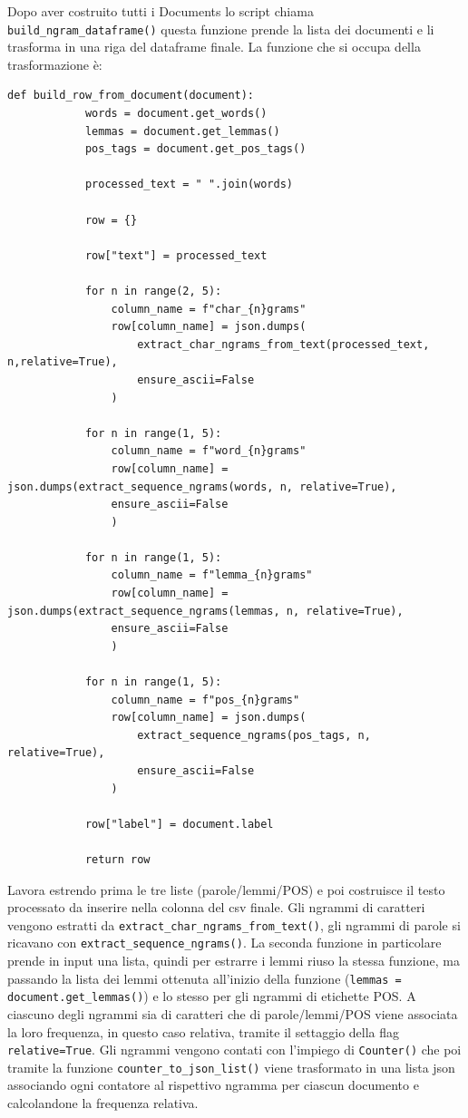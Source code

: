 \documentclass[a4paper,12pt]{report}
\begin{document}
    Dopo aver costruito tutti i Documents lo script chiama \texttt{build\_ngram\_dataframe()} questa funzione prende la lista dei documenti e li trasforma in una riga del dataframe finale. La funzione che si occupa della trasformazione è:
    \begin{lstlisting}[style=rulednumbered, language=python*, gobble=4]
        def build_row_from_document(document):
            words = document.get_words()
            lemmas = document.get_lemmas()
            pos_tags = document.get_pos_tags()

            processed_text = " ".join(words)

            row = {}

            row["text"] = processed_text

            for n in range(2, 5):
                column_name = f"char_{n}grams"
                row[column_name] = json.dumps(
                    extract_char_ngrams_from_text(processed_text, n,relative=True),
                    ensure_ascii=False
                )

            for n in range(1, 5):
                column_name = f"word_{n}grams"
                row[column_name] = json.dumps(extract_sequence_ngrams(words, n, relative=True),
                ensure_ascii=False
                )

            for n in range(1, 5):
                column_name = f"lemma_{n}grams"
                row[column_name] = json.dumps(extract_sequence_ngrams(lemmas, n, relative=True),
                ensure_ascii=False
                )

            for n in range(1, 5):
                column_name = f"pos_{n}grams"
                row[column_name] = json.dumps(
                    extract_sequence_ngrams(pos_tags, n, relative=True),
                    ensure_ascii=False
                )

            row["label"] = document.label

            return row
    \end{lstlisting}
    Lavora estrendo prima le tre liste (parole/lemmi/POS) e poi costruisce il testo processato da inserire nella colonna del csv finale. Gli ngrammi di caratteri vengono estratti da \texttt{extract\_char\_ngrams\_from\_text()}, gli ngrammi di parole si ricavano con \texttt{extract\_sequence\_ngrams()}. La seconda funzione in particolare prende in input una lista, quindi per estrarre i lemmi riuso la stessa funzione, ma passando la lista dei lemmi ottenuta all'inizio della funzione (\texttt{lemmas = document.get\_lemmas()}) e lo stesso per gli ngrammi di etichette POS. A ciascuno degli ngrammi sia di caratteri che di parole/lemmi/POS viene associata la loro frequenza, in questo caso relativa, tramite il settaggio della flag \texttt{relative=True}. Gli ngrammi vengono contati con l'impiego di \texttt{Counter()} che poi tramite la funzione \texttt{counter\_to\_json\_list()} viene trasformato in una lista json associando ogni contatore al rispettivo ngramma per ciascun documento e calcolandone la frequenza relativa. 
\end{document}
